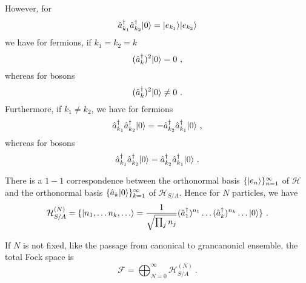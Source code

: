     However, for 
    \begin{equation*}
        \hat a_{k_1}^\dagger \hat a_{k_2}^\dagger \vert0\rangle = \vert e_{k_1}\rangle \vert e_{k_2}\rangle 
    \end{equation*}
    we have for fermions, if $k_1 = k_2 = k$
    \begin{equation*}
    (\hat a^\dagger_k)^2 \vert0\rangle = 0 ~,
    \end{equation*}
    whereas for bosons 
    \begin{equation*}
        (\hat a^\dagger_k)^2 \vert0\rangle \neq 0 ~.
    \end{equation*}
    Furthermore, if $k_1 \neq  k_2$, we have for fermions
    \begin{equation*}
        \hat a^\dagger_{k_1} \hat a^\dagger_{k_2} \vert0\rangle = - \hat a^\dagger_{k_2} \hat a^\dagger_{k_1} \vert0\rangle ~,
    \end{equation*}
    whereas for bosons 
    \begin{equation*}
        \hat a^\dagger_{k_1} \hat a^\dagger_{k_2} \vert0\rangle = \hat a^\dagger_{k_2} \hat a^\dagger_{k_1} \vert0\rangle ~.
    \end{equation*}

    There is a $1-1$ correspondence between the orthonormal basis  $\{\vert e_n\rangle\}_{n=1}^\infty$ of $\mathcal H$ and the orthonormal basis $\{\hat a_k \vert0\rangle\}_{k=1}^\infty$ of $\mathcal H_{S/A}$. Hence for $N$ particles, we have 
    \begin{equation*}
        \mathcal H_{S/A}^{(N)} = \{\vert n_1, \ldots n_k, \ldots\rangle = \frac{1}{\sqrt{ \prod_j n_j}} (\hat a_1^\dagger)^{n_1} \ldots (\hat a_k^\dagger)^{n_k} \ldots \vert0\rangle \} ~.
    \end{equation*} 

    If $N$ is not fixed, like the passage from canonical to grancanonicl ensemble, the total Fock space is 
    \begin{equation*}
        \mathcal F = \bigoplus_{N=0}^\infty \mathcal H^{(N)}_{S/A} ~.
    \end{equation*} 

